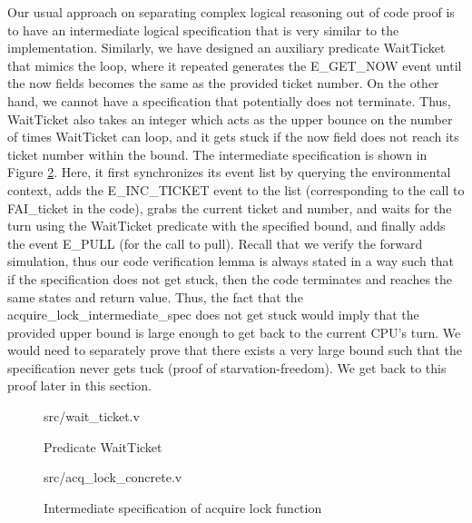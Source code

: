Our usual approach on separating complex logical reasoning out of code proof is to have an intermediate
logical specification that is very similar to the implementation. Similarly, we have designed an auxiliary predicate
\textsf{WaitTicket} that mimics the loop, where it repeated generates the \textsf{E\_GET\_NOW}
event until the \textsf{now} fields becomes the same as the provided ticket number. 
On the other hand, we cannot have a specification that potentially does not terminate.
Thus, \textsf{WaitTicket} also takes an integer  which acts as the upper bounce on the
number of times \textsf{WaitTicket} can loop, and it gets stuck if the \textsf{now} field
does not reach its ticket number within the bound.
The intermediate specification is shown in Figure \ref{fig:acq_lock_concrete_v}.
Here, it first synchronizes its event list by querying the environmental context, adds the
\textsf{E\_INC\_TICKET} event to the list (corresponding to the call to \textsf{FAI\_ticket} in the code),
grabs the current ticket and number, and waits for the turn using the \textsf{WaitTicket} predicate
with the specified bound, and finally adds the event \textsf{E\_PULL} (for the call to \textsf{pull}).
Recall that we verify the forward simulation, thus our code verification lemma is always stated
in a way such that if the specification does not get stuck, then the code terminates and reaches
the same states and return value. Thus, the fact that the \textsf{acquire\_lock\_intermediate\_spec}
does not get stuck would imply that the provided upper bound is large enough to get back to
the current CPU's turn. We would need to separately prove that there exists a very large bound
such that the specification never gets tuck (proof of starvation-freedom). We get back to this proof later
in this section.

\begin{figure}
	 {src/wait_ticket.v}
	\caption{Predicate WaitTicket}
	\label{fig:wait_ticket_v}
\end{figure}

\begin{figure}
	 {src/acq_lock_concrete.v}
	\caption{Intermediate specification of acquire lock function}
	\label{fig:acq_lock_concrete_v}
\end{figure}

